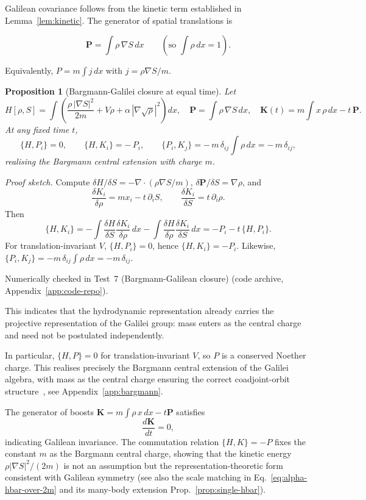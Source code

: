 \documentclass[11pt,a4paper]{article}
\numberwithin{equation}{section}
\theoremstyle{thmcompact}
\newtheorem{proposition}[theorem]{Proposition}
\theoremstyle{remark}
\begin{document}
Galilean covariance follows from the kinetic term established in Lemma~\ref{lem:kinetic}.
The generator of spatial translations is

\[
\mathbf P = \int \rho\,\nabla S\,dx \qquad (\text{so } \int\rho\,dx=1).
\]

Equivalently, $P=m\!\int j\,dx$ with $j=\rho\nabla S/m$.
\smallskip
\begin{proposition}[Bargmann-Galilei closure at equal time]
	Let
	\[
	H[\rho,S]=\!\int\!\left(
	\frac{\rho\,|\nabla S|^2}{2m}+V\rho
	+\alpha\,|\nabla\sqrt\rho|^2
	\right)\!dx,\quad
	\mathbf P=\!\int\!\rho\,\nabla S\,dx,\quad
	\mathbf K(t)=m\!\int\!x\,\rho\,dx-t\,\mathbf P.
	\]
	At any fixed time $t$,
	\[
	\{H,P_i\}=0,\qquad
	\{H,K_i\}=-\,P_i,\qquad
	\{P_i,K_j\}=-\,m\,\delta_{ij}\!\int\!\rho\,dx=-\,m\,\delta_{ij},
	\]
	realising the Bargmann central extension with charge $m$.
\end{proposition}

\textit{Proof sketch.}
Compute $\delta H/\delta S=-\nabla\!\cdot(\rho\nabla S/m)$,
$\delta \mathbf P/\delta S=\nabla\rho$,
and
\[
\frac{\delta K_i}{\delta \rho}=m x_i - t\,\partial_i S,\qquad
\frac{\delta K_i}{\delta S}=t\,\partial_i \rho.
\]
Then
\[
\{H,K_i\}=-\!\int\!\frac{\delta H}{\delta S}\frac{\delta K_i}{\delta \rho}\,dx
-\!\int\!\frac{\delta H}{\delta \rho}\frac{\delta K_i}{\delta S}\,dx
= -P_i - t\,\{H,P_i\}.
\]
For translation-invariant $V$, $\{H,P_i\}=0$, hence $\{H,K_i\}=-P_i$. Likewise,
$\{P_i,K_j\}=-m\,\delta_{ij}\int\rho\,dx=-m\,\delta_{ij}$.

Numerically checked in Test~7 (Bargmann-Galilean closure) (code archive, Appendix~\ref{app:code-repo}).

This indicates that the hydrodynamic representation already carries the projective representation of the Galilei group: mass enters as the central charge and need not be postulated independently.

In particular, $\{H,P\}=0$ for translation-invariant $V$, so $P$ is a conserved Noether charge. 
This realises precisely the Bargmann central extension of the Galilei algebra, with mass as the central charge ensuring the correct coadjoint-orbit structure~\cite{figueroa2024}, see Appendix~\ref{app:bargmann}.

The generator of boosts $\mathbf{K}=m\int\rho\,x\,dx - t\mathbf{P}$ satisfies
\[
\frac{d\mathbf{K}}{dt}=0,
\]
indicating Galilean invariance.
The commutation relation $\{H,K\}=-P$ fixes the constant $m$ as the Bargmann central charge, showing that the kinetic energy $\rho |\nabla S|^{2}/(2m)$ is not an assumption but the representation-theoretic form consistent with Galilean symmetry (see also the scale matching in Eq.~\eqref{eq:alpha-hbar-over-2m} and its many-body extension Prop.~\ref{prop:single-hbar}).
\end{document}
